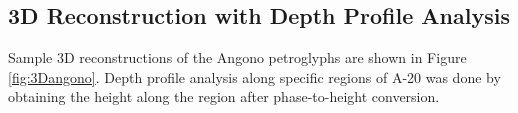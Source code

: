 
\subsection{3D Reconstruction with Depth Profile Analysis}

Sample 3D reconstructions of the Angono petroglyphs are shown in Figure \ref{fig:3Dangono}. Depth profile analysis along specific regions of A-20 was done by obtaining the height along the region after phase-to-height conversion. 

